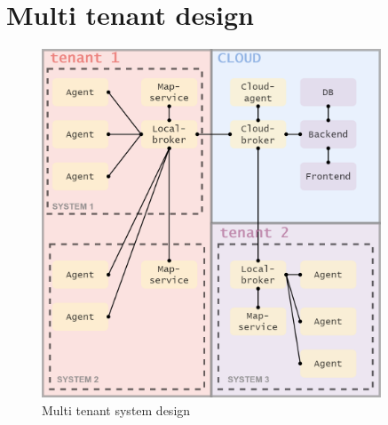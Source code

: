 \chapter{Multi tenant design}
\label{sec:app_03}

\begin{figure}[H]
    \centering
    \includegraphics[width=0.9\textwidth]{pictures/multi_tenant_detailed.png}
    \caption{Multi tenant system design}
    \label{fig:multi_tenant_detailed}
\end{figure}
